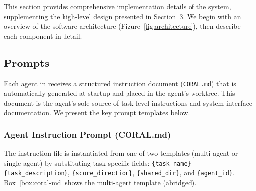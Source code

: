 This section provides comprehensive implementation details of the \method{} system, supplementing the high-level design presented in Section~3. We begin with an overview of the software architecture (Figure~\ref{fig:architecture}), then describe each component in detail.



\subsection{Prompts}
\label{app:prompts}

Each agent in \method{} receives a structured instruction document (\texttt{CORAL.md}) that is automatically generated at startup and placed in the agent's worktree. This document is the agent's sole source of task-level instructions and system interface documentation. We present the key prompt templates below.

\subsubsection{Agent Instruction Prompt (CORAL.md)}

The instruction file is instantiated from one of two templates (multi-agent or single-agent) by substituting task-specific fields: \texttt{\{task\_name\}}, \texttt{\{task\_description\}}, \texttt{\{score\_direction\}}, \texttt{\{shared\_dir\}}, and \texttt{\{agent\_id\}}. Box~\ref{box:coral-md} shows the multi-agent template (abridged).

